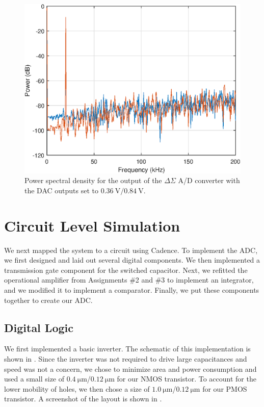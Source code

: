 \documentclass[journal,hidelinks]{IEEEtran}
\begin{document}
\begin{figure}[!htb]
  \centering
  \includegraphics[width=0.8\columnwidth]{simulation/psd.eps}
  \caption{Power spectral density for the output of the $\Delta \Sigma$ A/D converter with the DAC outputs set to $\SI{0.36}{\volt}/\SI{0.84}{\volt}$.}
  \label{fig:sim_psd}
\end{figure}

\section{Circuit Level Simulation}

We next mapped the system to a circuit using Cadence. To implement the ADC, we first designed and laid out several digital components. We then implemented a transmission gate component for the switched capacitor. Next, we refitted the operational amplifier from Assignments \#2 and \#3 to implement an integrator, and we modified it to implement a comparator. Finally, we put these components together to create our ADC.

\subsection{Digital Logic}

We first implemented a basic inverter. The schematic of this implementation is shown in . Since the inverter was not required to drive large capacitances and speed was not a concern, we chose to minimize area and power consumption and used a small size of $\SI{0.4}{\micro\meter}$/$\SI{0.12}{\micro\meter}$ for our NMOS transistor. To account for the lower mobility of holes, we then chose a size of $\SI{1.0}{\micro\meter}$/$\SI{0.12}{\micro\meter}$ for our PMOS transistor. A screenshot of the layout is shown in .
\end{document}
